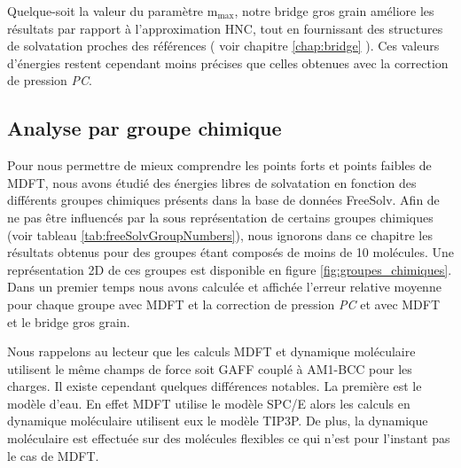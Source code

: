 Quelque-soit la valeur du paramètre $\mathrm{m}_\mathrm{max}$, notre bridge gros grain améliore les résultats par rapport à l'approximation HNC, tout en fournissant des structures de solvatation proches des références ( voir chapitre \ref{chap:bridge} ). Ces valeurs d'énergies restent cependant moins précises que celles obtenues avec la correction de pression \textit{PC}.





\subsection{Analyse par groupe chimique}
Pour nous permettre de mieux comprendre les points forts et points faibles de MDFT, nous avons étudié des énergies libres de solvatation en fonction des différents groupes chimiques présents dans la base de données FreeSolv. Afin de ne pas être influencés par la sous représentation de certains groupes chimiques (voir tableau \ref{tab:freeSolvGroupNumbers}), nous ignorons dans ce chapitre les résultats obtenus pour des groupes étant composés de moins de 10 molécules. Une représentation 2D de ces groupes est disponible en figure \ref{fig:groupes_chimiques}. Dans un premier temps nous avons calculée et affichée l'erreur relative moyenne pour chaque groupe avec MDFT et la correction de pression \textit{PC} et avec MDFT et le bridge gros grain.

Nous rappelons au lecteur que les calculs MDFT et dynamique moléculaire utilisent le même champs de force soit GAFF couplé à AM1-BCC pour les charges. Il existe cependant quelques différences notables. La première est le modèle d'eau. En effet MDFT utilise le modèle SPC/E alors les calculs en dynamique moléculaire utilisent eux le modèle TIP3P. De plus, la dynamique moléculaire est effectuée sur des molécules flexibles ce qui n'est pour l'instant pas le cas de MDFT. 

